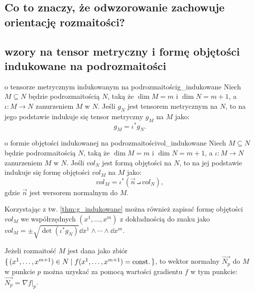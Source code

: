 \documentclass{article}
\newcommand\at[2]{\left.#1\right|_{#2}}
\begin{document}
\subsection{Co to znaczy, że odwzorowanie zachowuje orientację rozmaitości?}\label{sec:orientacja}

\subsection{wzory na tensor metryczny i formę objętości indukowane na podrozmaitości}\label{sec:indukowane_g_vol}


\begin{tw}{o tensorze metrycznym indukowanym na podrozmaitości}{g_indukowane}
Niech $M\subseteq N$ będzie podrozmaitością $N$, taką że $\dim{M}=m$ i $\dim{N}=m+1$, a $\iota\!:M\to N$ zanurzeniem $M$ w $N$. Jeśli $g_N$ jest tensorem metrycznym na $N$, to na jego podstawie indukuje się tensor metryczny $g_M$ na $M$ jako:
\[
g_M = \iota^* g_N.
\]
\end{tw}

\begin{tw}{o formie objętości indukowanej na podrozmaitości}{vol_indukowane}
  Niech $M\subseteq N$ będzie podrozmaitością $N$, taką że $\dim{M}=m$ i $\dim{N}=m+1$, a $\iota\!:M\to N$ zanurzeniem $M$ w $N$. Jeśli ${vol}_N$ jest formą objętości na $N$, to na jej podstawie indukuje się formę objętości ${vol}_M$ na $M$ jako:
  \[
  {vol}_M = \iota^*(\vec{n}\intprod {vol}_N),
  \]
  gdzie $\vec{n}$ jest wersorem normalnym do $M$.
\end{tw}

Korzystając z tw. \ref{thm:g_indukowane} można również zapisać formę objętości ${vol}_M$ we współrzędnych $(x^1,\ldots,x^m)$ z dokładnością do znaku jako ${vol}_M=\pm\sqrt{\det(\iota^* g_N)}\dd{x^1}\wedge\cdots\wedge\dd{x^m}$. 

Jeżeli rozmaitość $M$ jest dana jako zbiór $\set{(x^1,\ldots,x^{m+1})\in N|f(x^1,\ldots,x^{m+1})=\text{const.}}$, to wektor normalny $\vec{N_p}$ do $M$ w punkcie $p$ można uzyskać za pomocą wartości gradientu $f$ w tym punkcie: $\vec{N_p} = \at{\nabla f}{p}$.
\end{document}
